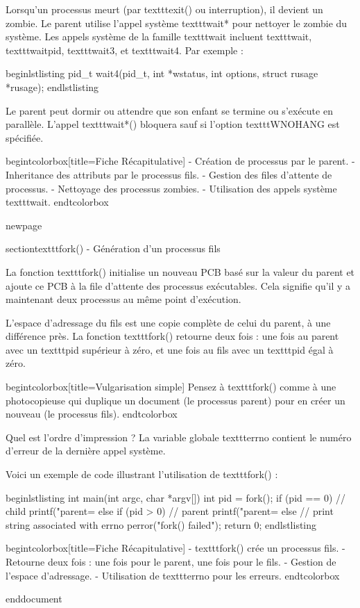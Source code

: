 Lorsqu'un processus meurt (par texttt{exit()} ou interruption), il devient un zombie. Le parent utilise l'appel système texttt{wait*} pour nettoyer le zombie du système. Les appels système de la famille texttt{wait} incluent texttt{wait}, texttt{waitpid}, texttt{wait3}, et texttt{wait4}. Par exemple :

begin{lstlisting}
pid_t wait4(pid_t, int *wstatus, int options, struct rusage *rusage);
end{lstlisting}

Le parent peut dormir ou attendre que son enfant se termine ou s'exécute en parallèle. L'appel texttt{wait*()} bloquera sauf si l'option texttt{WNOHANG} est spécifiée.

begin{tcolorbox}[title={Fiche Récapitulative}]
- Création de processus par le parent.
- Inheritance des attributs par le processus fils.
- Gestion des files d'attente de processus.
- Nettoyage des processus zombies.
- Utilisation des appels système texttt{wait}.
end{tcolorbox}

newpage

section{texttt{fork()} - Génération d'un processus fils}

La fonction texttt{fork()} initialise un nouveau PCB basé sur la valeur du parent et ajoute ce PCB à la file d'attente des processus exécutables. Cela signifie qu'il y a maintenant deux processus au même point d'exécution.

L'espace d'adressage du fils est une copie complète de celui du parent, à une différence près. La fonction texttt{fork()} retourne deux fois : une fois au parent avec un texttt{pid} supérieur à zéro, et une fois au fils avec un texttt{pid} égal à zéro.

begin{tcolorbox}[title={Vulgarisation simple}]
Pensez à texttt{fork()} comme à une photocopieuse qui duplique un document (le processus parent) pour en créer un nouveau (le processus fils).
end{tcolorbox}

Quel est l'ordre d'impression ? La variable globale texttt{errno} contient le numéro d'erreur de la dernière appel système.

Voici un exemple de code illustrant l'utilisation de texttt{fork()} :

begin{lstlisting}
int main(int argc, char *argv[]) {
    int pid = fork();
    if (pid == 0) {
        // child
        printf("parent=%
    } else if (pid > 0) {
        // parent
        printf("parent=%
    } else {
        // print string associated with errno
        perror("fork() failed");
    }
    return 0;
}
end{lstlisting}

begin{tcolorbox}[title={Fiche Récapitulative}]
- texttt{fork()} crée un processus fils.
- Retourne deux fois : une fois pour le parent, une fois pour le fils.
- Gestion de l'espace d'adressage.
- Utilisation de texttt{errno} pour les erreurs.
end{tcolorbox}

end{document}